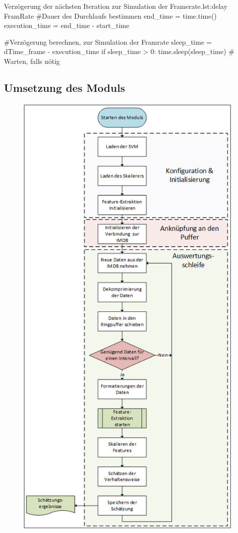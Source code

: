 \begin{pythoncode}{Verzögerung der nächsten Iteration zur  Simulation der Framerate.}{lst:delay FramRate}
#Dauer des Durchlaufs bestimmen 
end_time = time.time()
execution_time = end_time - start_time 

#Verzögerung berechnen, zur Simulation der Framrate
sleep_time = dTime_frame - execution_time 
if sleep_time > 0:
    time.sleep(sleep_time)  # Warten, falls nötig
\end{pythoncode}


\subsection{Umsetzung des Moduls}

\begin{figure}[p]
    \centering
    \includegraphics[height=0.9\textheight]{img/Grafiken/Flussdiagramm Modul.png}

\end{figure}
